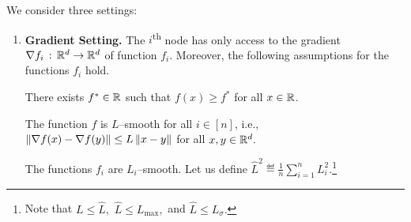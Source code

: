 \documentclass{article}
\begin{document}
We consider three settings:
\begin{enumerate}[leftmargin=0.75cm]
\item \textbf{Gradient Setting.}
The $i$\textsuperscript{th} node has only access to the gradient $\nabla f_i \,:\,\mathbb{R}^d \rightarrow \mathbb{R}^d$ of function $f_i$. Moreover, the following assumptions for the functions $f_i$ hold.
\begin{assumption}
    \label{ass:lower_bound}
    There exists $f^* \in \mathbb{R}$ such that $f(x) \geq f^*$ for all $x \in \mathbb{R}$.
\end{assumption}
\begin{assumption}
    \label{ass:lipschitz_constant}
    The function $f$ is $L$--smooth for all $i \in [n]$, i.e., $\left\| \nabla f(x) - \nabla f(y) \right\| \leq L \left\| x - y \right\|$ for all $x, y \in \mathbb{R}^d.$
\end{assumption}
\begin{assumption} \leavevmode
    \label{ass:nodes_lipschitz_constant}
    The functions $f_i$ are $L_i$--smooth. Let us define $\widehat{L}^2 \eqdef \frac{1}{n} \sum_{i=1}^{n} L_i^2.$\footnote{Note that $L \leq \widehat{L},$ $\widehat{L} \leq L_{\max},$ and $\widehat{L} \leq L_{\sigma}.$}
\end{assumption}


\end{enumerate}
\end{document}
